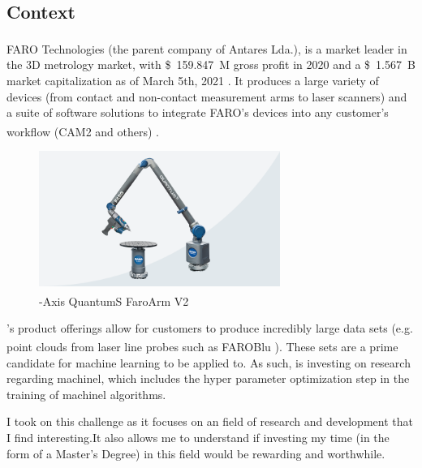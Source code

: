 
\subsection{Context}

FARO Technologies\textsuperscript{\textregistered} (the parent company of Antares Lda.), is a market leader in the 3D metrology market, with \SI{159.847}[\$]{M} gross profit in 2020 \parencite{faro_2021_financial_results} and a \SI{1.567}[\$]{B} market capitalization as of March 5th, 2021 \parencite{faro_stock_info}. It produces a large variety of devices (from contact and non-contact measurement arms to laser scanners) and a suite of software solutions to integrate FARO's devices into any customer's workflow (CAM2\textsuperscript{\textregistered} and others) \parencite{faro_homepage}.

\begin{figure}[h]
\centering
\includegraphics[width=0.7\textwidth]{images/faro_quantum_s_arm.png}
\caption{-Axis QuantumS FaroArm\textsuperscript{\textregistered} V2}
\end{figure}
 
\faro's product offerings allow for customers to produce incredibly large data sets (e.g. point clouds from laser line probes such as FAROBlu\textsuperscript{\textregistered} \parencite{faro_quantums}). These sets are a prime candidate for machine learning to be applied to. As such, \faro is investing on research regarding \acrlong{machinel}, which includes the hyper parameter optimization step in the training of \acrshort{machinel} algorithms.

I took on this challenge as it focuses on an field of research and development that I find interesting.It also allows me to understand if investing my time (in the form of a Master's Degree) in this field would be rewarding and worthwhile.
